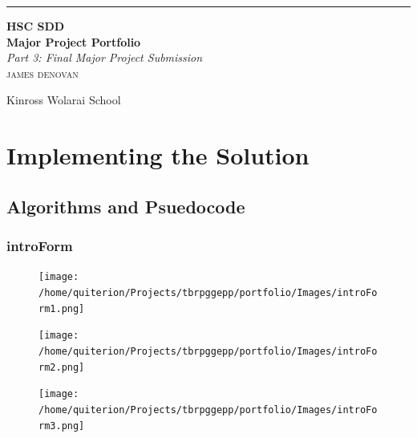 \documentclass{article} \usepackage[margin=1in,headheight=57pt,headsep=0.1in]{geometry}
\begin{document}
\begin{titlepage} %

	\raggedleft %

	\rule{1pt}{\textheight} %
	\hspace{0.05\textwidth} %
	\parbox[b]{0.75\textwidth}{ %

		{\Huge\bfseries HSC SDD \\[0.5\baselineskip] Major Project Portfolio}\\[2\baselineskip] %
		{\large\textit{Part 3: Final Major Project Submission}}\\[4\baselineskip] %
		{\Large\textsc{james denovan}} %

		\vspace{0.5\textheight} %

		{\noindent Kinross Wolarai School}\\[\baselineskip] %
	}

\end{titlepage}
\thispagestyle{empty}
\tableofcontents
\pagebreak
\pagestyle{fancy}
\section{Implementing the Solution}
\subsection{Algorithms and Psuedocode}
\subsubsection{introForm}
\begin{figure}[H]
	\centering
	\texttt{[image: /home/quiterion/Projects/tbrpggepp/portfolio/Images/introForm1.png]}
\end{figure}
\begin{figure}[H]
	\centering
	\texttt{[image: /home/quiterion/Projects/tbrpggepp/portfolio/Images/introForm2.png]}
\end{figure}
\begin{figure}[H]
	\centering
	\texttt{[image: /home/quiterion/Projects/tbrpggepp/portfolio/Images/introForm3.png]}
\end{figure}
\end{document}
